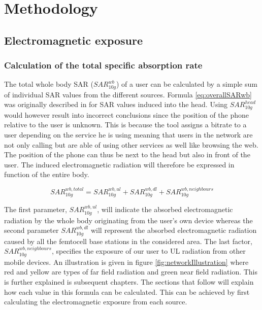 \chapter{Methodology}
\label{chap:methodology}




\section{Electromagnetic exposure}
\subsection{Calculation of the total specific absorption rate} %
\label{sub:Calculationexposure}

The total whole body \gls{SAR} ($SAR^{wb}_{10g}$) of a user can be calculated by a simple sum of individual SAR values from the different sources.
Formula \ref{eq:overallSARwb} was originally described in \cite{J17_kuehn2019modelling} for \gls{SAR} values induced into the head.
Using $SAR^{head}_{10g}$ would however result into incorrect conclusions since 
the position of the phone relative to the user is unknown. This is because the tool assigns a bitrate 
to a user depending on the service he is using
meaning that users in the network are not only calling but are able of using other services as well like browsing the web. 
The position of the phone can thus be next to the head but also in front of the user.
The induced electromagnetic radiation will therefore be expressed in function of the entire body.


\begin{equation} 
SAR^{wb,total}_{10g} = SAR^{wb,ul}_{10g} +  SAR^{wb,dl}_{10g} + SAR^{wb,neighbours}_{10g}
\label{eq:overallSARwb}
\end{equation}

The first parameter, $SAR^{wb,ul}_{10g}$, will indicate the absorbed electromagnetic radiation by the whole body originating from the user's own device
whereas the second parameter $SAR^{wb,dl}_{10g}$ will represent the absorbed electromagnetic radiation caused by all the femtocell base stations in the considered area.
The last factor, $SAR^{wb,neighbours}_{10g}$, specifies the exposure of our user to \gls{UL} radiation from other mobile devices.
An illustration is given in figure \ref{fig:networkIllustration} where red and yellow are types of far field radiation and green near field radiation. This is further 
explained is subsequent chapters.
The sections that follow will explain how each value in this formula can be calculated. This can be achieved by first calculating the electromagnetic exposure 
from each source. 

